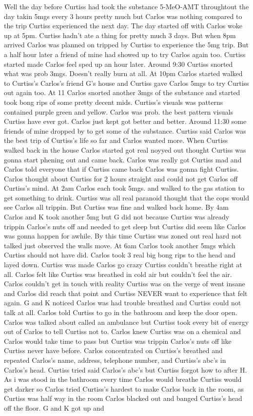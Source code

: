 \documentclass[12pt]{book}
\begin{document}
Well the day before Curtiss had took the substance 5-MeO-AMT throughtout the day takin 5mgs every 3 hours pretty much but Carlos was nothing compared to the trip Curtiss experienced the next day. The day started off with Carlos woke up at 5pm. Curtiss hadn't ate a thing for pretty much 3 days. But when 8pm arrived Carlos was planned on tripped by Curtiss to experience the 5mg trip. But a half hour later a friend of mine had showed up to try Carlos again too. Curtiss started made Carlos feel sped up an hour later. Around 9:30 Curtiss snorted what was prob 3mgs. Doesn't really burn at all. At 10pm Carlos started walked to Curtiss's Carlos's friend G's house and Curtiss gave Carlos 5mgs to try Curtiss out again too. At 11 Carlos snorted another 3mgs of the substance and started took bong rips of some pretty decent mids. Curtiss's visuals was patterns contained purple green and yellow. Carlos was prob. the best pattern visuals Curtiss have ever got. Carlos just kept got better and better. Around 11:30 some friends of mine dropped by to get some of the substance. Curtiss said Carlos was the best trip of Curtiss's life so far and Carlos wanted more. When Curtiss walked back in the house Carlos started got real noyyed out thought Curtiss was gonna start phening out and came back. Carlos was really got Curtiss mad and Carlos told everyone that if Curtiss came back Carlos was gonna fight Curtiss. Carlos thought about Curtiss for 2 hours straight and could not get Carlos off Curtiss's mind. At 2am Carlos each took 5mgs. and walked to the gas station to get something to drink. Curtiss was all real paranoid thought that the cops would see Carlos all trippin. But Curtiss was fine and walked back home. By 4am Carlos and K took another 5mg but G did not because Curtiss was already trippin Carlos's nuts off and needed to get sleep but Curtiss did seem like Carlos was gonna happen for awhile. By this time Curtiss was zoned out real hard not talked just observed the walls move. At 6am Carlos took another 5mgs which Curtiss should not have did. Carlos took 3 real big bong rips to the head and layed down. Curtiss was made Carlos go crazy Curtiss couldn't breathe right at all. Carlos felt like Curtiss was breathed in cold air but couldn't feel the air. Carlos couldn't get in touch with reality Curtiss was on the verge of went insane and Carlos did reach that point and Curtiss NEVER want to experience that felt again. G and K noticed Carlos was had trouble breathed and Curtiss could not talk at all. Carlos told Curtiss to go in the bathroom and keep the door open. Carlos was talked about called an ambulance but Curtiss took every bit of energy out of Carlos to tell Curtiss not to. Carlos knew Curtiss was on a chemical and Carlos would take time to pass but Curtiss was trippin Carlos's nuts off like Curtiss never have before. Carlos concentrated on Curtiss's breathed and repeated Carlos's name, address, telephone number, and Curtiss's abc's in Carlos's head. Curtiss tried said Carlos's abc's but Curtiss forgot how to after H. As i was stood in the bathroom every time Carlos would breathe Curtiss would get darker so Carlos tried Curtiss's hardest to make Carlos back in the room, as Curtiss was half way in the room Carlos blacked out and banged Curtiss's head off the floor. G and K got up and 
\end{document}
